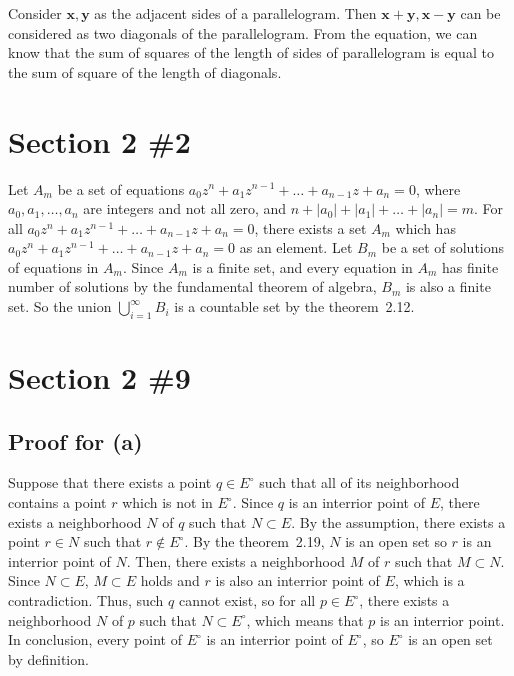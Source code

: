\documentclass{scrartcl}
\begin{document}
Consider \(\mathbf{x}, \mathbf{y}\) as the adjacent sides of a parallelogram.
Then \(\mathbf{x + y}, \mathbf{x - y}\) can be considered as two diagonals of the parallelogram.
From the equation, we can know that the sum of squares of the length of sides of parallelogram is equal to the sum of square of the length of diagonals.

\section{Section 2 \#2}
Let \(A_m\) be a set of equations \(a_0 z^n + a_1 z^{n - 1} + \dots + a_{n - 1} z + a_n = 0\), where \(a_0, a_1, \dots, a_n\) are integers and not all zero, and \(n + |a_0| + |a_1| + \dots + |a_n| = m\).
For all \(a_0 z^n + a_1 z^{n - 1} + \dots + a_{n - 1} z + a_n = 0\), there exists a set \(A_m\) which has \(a_0 z^n + a_1 z^{n - 1} + \dots + a_{n - 1} z + a_n = 0\) as an element.
Let \(B_m\) be a set of solutions of equations in \(A_m\).
Since \(A_m\) is a finite set, and every equation in \(A_m\) has finite number of solutions by the fundamental theorem of algebra, \(B_m\) is also a finite set.
So the union \(\bigcup_{i = 1}^\infty B_i\) is a countable set by the theorem~2.12.

\section{Section 2 \#9}
\subsection{Proof for (a)}
Suppose that there exists a point \(q \in E^\circ\) such that all of its neighborhood contains a point \(r\) which is not in \(E^\circ\).
Since \(q\) is an interrior point of \(E\), there exists a neighborhood \(N\) of \(q\) such that \(N \subset E\).
By the assumption, there exists a point \(r \in N\) such that \(r \not \in E^\circ\).
By the theorem~2.19, \(N\) is an open set so \(r\) is an interrior point of \(N\).
Then, there exists a neighborhood \(M\) of \(r\) such that \(M \subset N\).
Since \(N \subset E\), \(M \subset E\) holds and \(r\) is also an interrior point of \(E\), which is a contradiction.
Thus, such \(q\) cannot exist, so for all \(p \in E^\circ\), there exists a neighborhood \(N\) of \(p\) such that \(N \subset E^\circ\), which means that \(p\) is an interrior point.
In conclusion, every point of \(E^\circ\) is an interrior point of \(E^\circ\), so \(E^\circ\) is an open set by definition.
\end{document}
